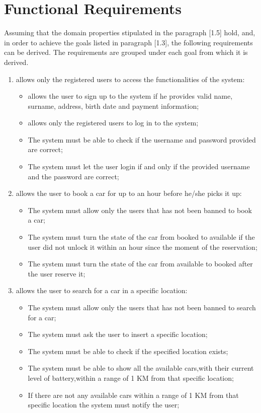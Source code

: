 \section{Functional Requirements}
Assuming that the domain properties stipulated in the paragraph [1.5] hold, and, in order to achieve the goals listed in paragraph [1.3], the following requirements can be derived. The requirements are grouped under each goal from which it is derived.

\begin{enumerate}

\item allows only the registered users to access the functionalities of the system:

\begin{itemize}
\item allows the user to sign up to the system if he provides valid name, surname, address, birth date and payment information; %
\item allows only the registered users to log in to the system;
\item The system must be able to check if the username and password provided are correct;
\item The system must let the user login if and only if the provided username and the password are correct;
\end{itemize}

\item allows the user to book a car for up to an hour before he/she picks it up:

\begin{itemize}
\item The system must allow only the users that has not been banned to book a car;
\item The system must turn the state of the car from booked to available if the user did not unlock it within an hour since the moment of the reservation;
\item The system must turn the state of the car from available to booked after the user reserve it;
\end{itemize}

\item allows the user to search for a car in a specific location:

\begin{itemize}
\item The system must allow only the users that has not been banned to search for a car;
\item The system must ask the user to insert a specific location;
\item The system must be able to check if the specified location exists;
\item The system must be able to show all the available cars,with their current level of battery,within a range of 1 KM from that specific location;
\item If there are not any available cars within a range of 1 KM from that specific location the system must notify the user;
\end{itemize}


\end{enumerate}
